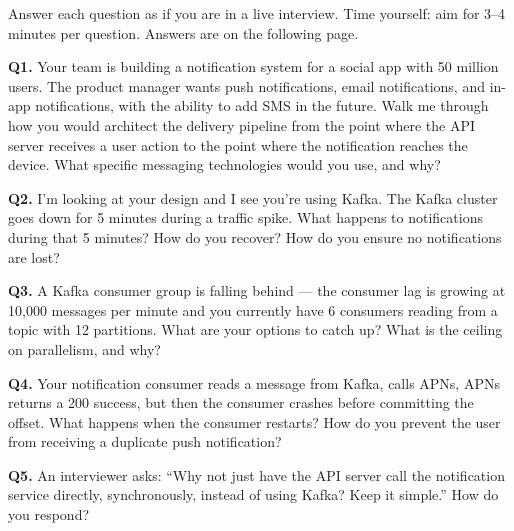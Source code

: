 \documentclass[11pt,a4paper]{article}
\begin{document}
Answer each question as if you are in a live interview. Time yourself: aim for 3--4 minutes per question. Answers are on the following page.

\begin{quizbox}
\textbf{Q1.} Your team is building a notification system for a social app with 50 million users. The product manager wants push notifications, email notifications, and in-app notifications, with the ability to add SMS in the future. Walk me through how you would architect the delivery pipeline from the point where the API server receives a user action to the point where the notification reaches the device. What specific messaging technologies would you use, and why?

\vspace{0.8em}
\textbf{Q2.} I'm looking at your design and I see you're using Kafka. The Kafka cluster goes down for 5 minutes during a traffic spike. What happens to notifications during that 5 minutes? How do you recover? How do you ensure no notifications are lost?

\vspace{0.8em}
\textbf{Q3.} A Kafka consumer group is falling behind --- the consumer lag is growing at 10,000 messages per minute and you currently have 6 consumers reading from a topic with 12 partitions. What are your options to catch up? What is the ceiling on parallelism, and why?

\vspace{0.8em}
\textbf{Q4.} Your notification consumer reads a message from Kafka, calls APNs, APNs returns a 200 success, but then the consumer crashes before committing the offset. What happens when the consumer restarts? How do you prevent the user from receiving a duplicate push notification?

\vspace{0.8em}
\textbf{Q5.} An interviewer asks: ``Why not just have the API server call the notification service directly, synchronously, instead of using Kafka? Keep it simple.'' How do you respond?
\end{quizbox}
\end{document}

